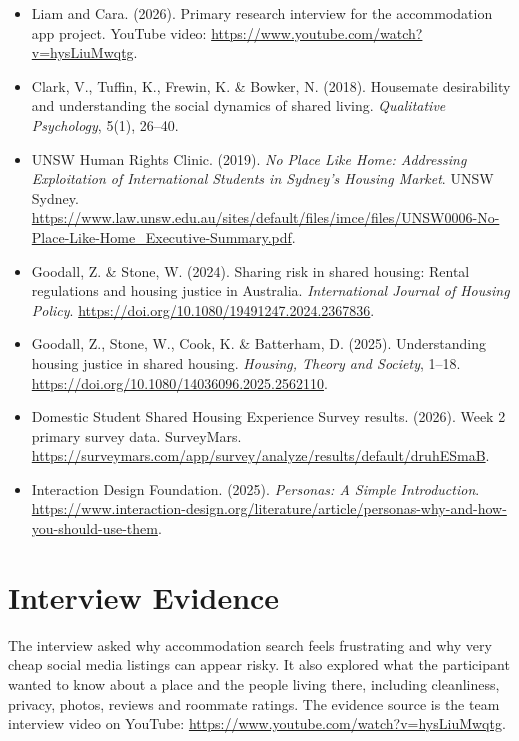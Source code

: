 \documentclass[11pt,a4paper]{article}
\begin{document}
\begingroup
\small
\sloppy
\begin{itemize}
    \item Liam and Cara. (2026). Primary research interview for the accommodation app project. YouTube video: \url{https://www.youtube.com/watch?v=hysLiuMwqtg}.
    \item Clark, V., Tuffin, K., Frewin, K. \& Bowker, N. (2018). Housemate desirability and understanding the social dynamics of shared living. \textit{Qualitative Psychology}, 5(1), 26--40.
    \item UNSW Human Rights Clinic. (2019). \textit{No Place Like Home: Addressing Exploitation of International Students in Sydney's Housing Market}. UNSW Sydney. \url{https://www.law.unsw.edu.au/sites/default/files/imce/files/UNSW0006-No-Place-Like-Home_Executive-Summary.pdf}.
    \item Goodall, Z. \& Stone, W. (2024). Sharing risk in shared housing: Rental regulations and housing justice in Australia. \textit{International Journal of Housing Policy}. \url{https://doi.org/10.1080/19491247.2024.2367836}.
    \item Goodall, Z., Stone, W., Cook, K. \& Batterham, D. (2025). Understanding housing justice in shared housing. \textit{Housing, Theory and Society}, 1--18. \url{https://doi.org/10.1080/14036096.2025.2562110}.
    \item Domestic Student Shared Housing Experience Survey results. (2026). Week 2 primary survey data. SurveyMars. \url{https://surveymars.com/app/survey/analyze/results/default/druhESmaB}.
    \item Interaction Design Foundation. (2025). \textit{Personas: A Simple Introduction}. \url{https://www.interaction-design.org/literature/article/personas-why-and-how-you-should-use-them}.
\end{itemize}
\endgroup

\appendix
\section{Interview Evidence}

The interview asked why accommodation search feels frustrating and why very cheap social media listings can appear risky. It also explored what the participant wanted to know about a place and the people living there, including cleanliness, privacy, photos, reviews and roommate ratings. The evidence source is the team interview video on YouTube: \url{https://www.youtube.com/watch?v=hysLiuMwqtg}.
\end{document}
